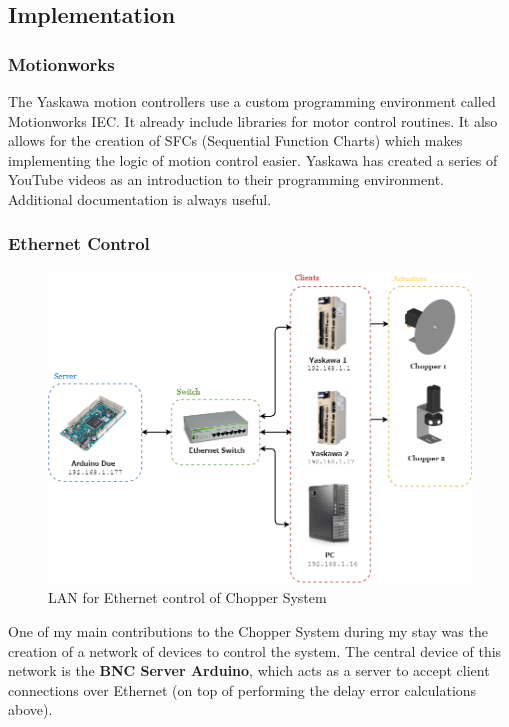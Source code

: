 \documentclass{article}
\begin{document}
    \subsection{Implementation} \label{chopper_implementation}
    
        \subsubsection{Motionworks}
        
            The Yaskawa motion controllers use a custom programming environment called Motionworks IEC. It already include libraries for motor control routines. It also allows for the creation of SFCs (Sequential Function Charts) which makes implementing the logic of motion control easier. Yaskawa has created a series of YouTube videos \cite{motionworks_youtube} as an introduction to their programming environment. Additional documentation \cite{motionworks} is always useful.
            
        \subsubsection{Ethernet Control}
        
            \begin{figure}[h]
                \centering
                \includegraphics[width=13cm]{img/regaedat_lan}
                \caption{LAN for Ethernet control of Chopper System}
                \label{fig:regaedat_lan}
            \end{figure}
            
            One of my main contributions to the Chopper System during my stay was the creation of a network of devices to control the system. The central device of this network is the \textbf{BNC Server Arduino}, which acts as a server to accept client connections over Ethernet (on top of performing the delay error calculations above).
            
\end{document}
